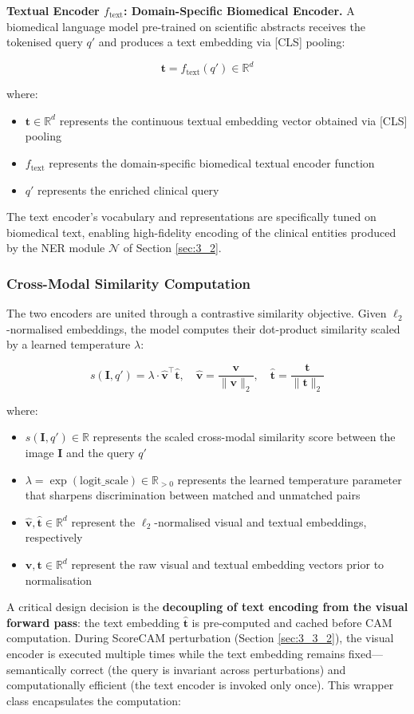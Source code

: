\textbf{Textual Encoder $f_{\text{text}}$: Domain-Specific Biomedical Encoder.} A biomedical language model pre-trained on scientific abstracts receives the tokenised query $q'$ and produces a text embedding via [CLS] pooling:

$$
\mathbf{t} = f_{\text{text}}(q') \in \mathbb{R}^d
$$

where:
\begin{itemize}
\item $\mathbf{t} \in \mathbb{R}^d$ represents the continuous textual embedding vector obtained via [CLS] pooling
\item $f_{\text{text}}$ represents the domain-specific biomedical textual encoder function
\item $q'$ represents the enriched clinical query
\end{itemize}

The text encoder's vocabulary and representations are specifically tuned on biomedical text, enabling high-fidelity encoding of the clinical entities produced by the NER module $\mathcal{N}$ of Section \ref{sec:3_2}.

\subsubsection{Cross-Modal Similarity Computation}
\label{sec:3_3_1_2}

The two encoders are united through a contrastive similarity objective. Given $\ell_2$-normalised embeddings, the model computes their dot-product similarity scaled by a learned temperature $\lambda$:

$$
s(\mathbf{I}, q') = \lambda \cdot \hat{\mathbf{v}}^{\top} \hat{\mathbf{t}}, \quad \hat{\mathbf{v}} = \frac{\mathbf{v}}{\|\mathbf{v}\|_2}, \quad \hat{\mathbf{t}} = \frac{\mathbf{t}}{\|\mathbf{t}\|_2}
$$

where:
\begin{itemize}
\item $s(\mathbf{I}, q') \in \mathbb{R}$ represents the scaled cross-modal similarity score between the image $\mathbf{I}$ and the query $q'$
\item $\lambda = \exp(\text{logit\_scale}) \in \mathbb{R}_{>0}$ represents the learned temperature parameter that sharpens discrimination between matched and unmatched pairs
\item $\hat{\mathbf{v}}, \hat{\mathbf{t}} \in \mathbb{R}^d$ represent the $\ell_2$-normalised visual and textual embeddings, respectively
\item $\mathbf{v}, \mathbf{t} \in \mathbb{R}^d$ represent the raw visual and textual embedding vectors prior to normalisation
\end{itemize} A critical design decision is the \textbf{decoupling of text encoding from the visual forward pass}: the text embedding $\hat{\mathbf{t}}$ is pre-computed and cached before CAM computation. During ScoreCAM perturbation (Section \ref{sec:3_3_2}), the visual encoder is executed multiple times while the text embedding remains fixed---semantically correct (the query is invariant across perturbations) and computationally efficient (the text encoder is invoked only once). This wrapper class encapsulates the computation:

